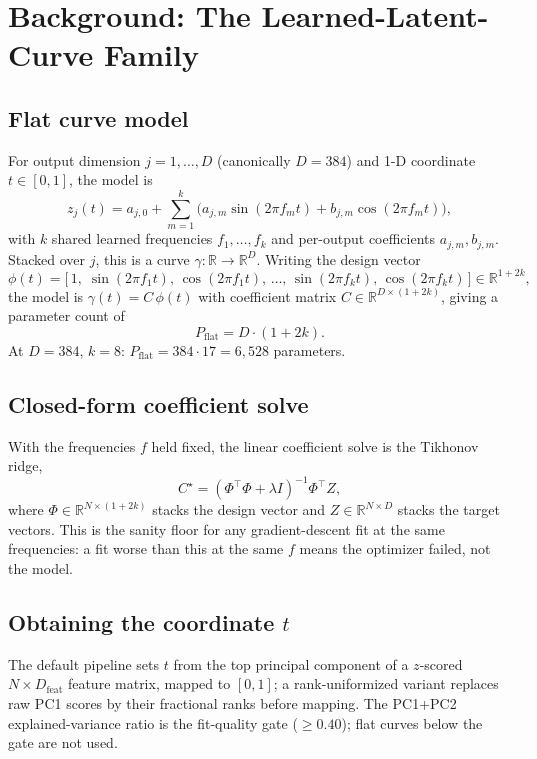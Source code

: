 \documentclass[11pt,a4paper]{article}
\theoremstyle{plain}
\theoremstyle{remark}
\theoremstyle{plain}
\begin{document}
\section{Background: The Learned-Latent-Curve Family}
\label{sec:family}

\subsection{Flat curve model}

For output dimension $j = 1, \dots, D$ (canonically $D = 384$) and 1-D coordinate $t \in [0, 1]$, the model is
\begin{equation}
z_j(t) = a_{j,0} + \sum_{m=1}^{k} \big( a_{j,m} \sin(2\pi f_m t) + b_{j,m} \cos(2\pi f_m t) \big),
\label{eq:flat}
\end{equation}
with $k$ shared learned frequencies $f_1, \dots, f_k$ and per-output coefficients $a_{j,m}, b_{j,m}$. Stacked over $j$, this is a curve $\gamma : \mathbb{R} \to \mathbb{R}^D$. Writing the design vector
\begin{equation}
\phi(t) = \big[\, 1,\; \sin(2\pi f_1 t),\, \cos(2\pi f_1 t),\, \dots,\, \sin(2\pi f_k t),\, \cos(2\pi f_k t) \,\big] \in \mathbb{R}^{1+2k},
\label{eq:design}
\end{equation}
the model is $\gamma(t) = C\, \phi(t)$ with coefficient matrix $C \in \mathbb{R}^{D \times (1+2k)}$, giving a parameter count of
\begin{equation}
P_{\mathrm{flat}} = D \cdot (1 + 2k).
\label{eq:paramflat}
\end{equation}
At $D = 384$, $k = 8$: $P_{\mathrm{flat}} = 384 \cdot 17 = 6{,}528$ parameters.

\subsection{Closed-form coefficient solve}

With the frequencies $f$ held fixed, the linear coefficient solve is the Tikhonov ridge,
\begin{equation}
C^{\star} = (\Phi^{\top}\Phi + \lambda I)^{-1} \Phi^{\top} Z,
\label{eq:ridge}
\end{equation}
where $\Phi \in \mathbb{R}^{N \times (1+2k)}$ stacks the design vector and $Z \in \mathbb{R}^{N \times D}$ stacks the target vectors. This is the sanity floor for any gradient-descent fit at the same frequencies: a fit worse than this at the same $f$ means the optimizer failed, not the model.

\subsection{Obtaining the coordinate $t$}
The default pipeline sets $t$ from the top principal component of a $z$-scored $N \times D_{\mathrm{feat}}$ feature matrix, mapped to $[0,1]$; a rank-uniformized variant replaces raw PC1 scores by their fractional ranks before mapping. The PC1+PC2 explained-variance ratio is the fit-quality gate ($\geq 0.40$); flat curves below the gate are not used.
\end{document}
